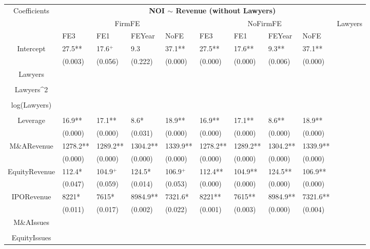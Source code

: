 \documentclass{article}
\begin{document}
\begin{table}[H]
\centering
\begin{tabular}{|clllllllll|}
\hline
\multirow{3}{*}{Coefficients} & \multicolumn{9}{c|}{\textbf{NOI $\sim$ Revenue (without Lawyers)}} \\
\cline{2-10}
& \multicolumn{4}{c}{FirmFE} & \multicolumn{4}{c}{NoFirmFE} & \multirow{2}{*}{Lawyers} \\
\cline{2-9}
& FE3 & FE1 & FEYear & NoFE & FE3 & FE1 & FEYear & NoFE &  \\
\hline
 
Intercept & 27.5** & 17.6$^{+}$ & 9.3 & 37.1** & 27.5** & 17.6** & 9.3** & 37.1** & \\ 
   & (0.003) & (0.056) & (0.222) & (0.000) & (0.000) & (0.000) & (0.006) & (0.000) & \\ 
  Lawyers &  &  &  &  &  &  &  &  & \\ 
   &  &  &  &  &  &  &  &  & \\ 
  Lawyers^2 &  &  &  &  &  &  &  &  & \\ 
   &  &  &  &  &  &  &  &  & \\ 
  log(Lawyers) &  &  &  &  &  &  &  &  & \\ 
   &  &  &  &  &  &  &  &  & \\ 
  Leverage & 16.9** & 17.1** & 8.6* & 18.9** & 16.9** & 17.1** & 8.6** & 18.9** & \\ 
   & (0.000) & (0.000) & (0.031) & (0.000) & (0.000) & (0.000) & (0.000) & (0.000) & \\ 
  M\&ARevenue & 1278.2** & 1289.2** & 1304.2** & 1339.9** & 1278.2** & 1289.2** & 1304.2** & 1339.9** & \\ 
   & (0.000) & (0.000) & (0.000) & (0.000) & (0.000) & (0.000) & (0.000) & (0.000) & \\ 
  EquityRevenue & 112.4* & 104.9$^{+}$ & 124.5* & 106.9$^{+}$ & 112.4** & 104.9** & 124.5** & 106.9** & \\ 
   & (0.047) & (0.059) & (0.014) & (0.053) & (0.000) & (0.000) & (0.000) & (0.000) & \\ 
  IPORevenue & 8221* & 7615* & 8984.9** & 7321.6* & 8221** & 7615** & 8984.9** & 7321.6** & \\ 
   & (0.011) & (0.017) & (0.002) & (0.022) & (0.001) & (0.003) & (0.000) & (0.004) & \\ 
  M\&AIssues &  &  &  &  &  &  &  &  & \\ 
   &  &  &  &  &  &  &  &  & \\ 
  EquityIssues &  &  &  &  &  &  &  &  & \\ 

\end{tabular}
\end{table}
\end{document}
